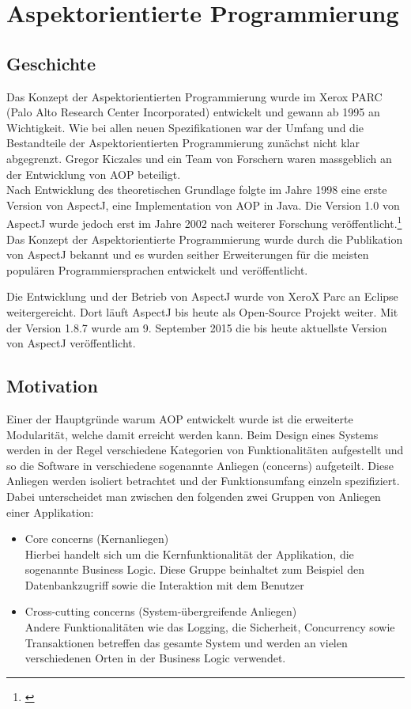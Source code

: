 \chapter{Aspektorientierte Programmierung}
\label{chap:aop}

\section{Geschichte}
\label{sec:aop_geschichte}

Das Konzept der Aspektorientierten Programmierung wurde im Xerox PARC (Palo Alto Research Center Incorporated) entwickelt und gewann ab 1995 an Wichtigkeit. Wie bei allen neuen Spezifikationen war der Umfang und die Bestandteile der Aspektorientierten Programmierung zunächst nicht klar abgegrenzt. Gregor Kiczales und ein Team von Forschern waren massgeblich an der Entwicklung von AOP beteiligt.\\
Nach Entwicklung des theoretischen Grundlage folgte im Jahre 1998 eine erste Version von AspectJ, eine Implementation von AOP in Java. Die Version 1.0 von AspectJ wurde jedoch erst im Jahre 2002 nach weiterer Forschung veröffentlicht.\footnote{\cite{lopes:historyaop}} \\
Das Konzept der Aspektorientierte Programmierung wurde durch die Publikation von AspectJ bekannt und es wurden seither Erweiterungen für die meisten populären Programmiersprachen entwickelt und veröffentlicht. 

Die Entwicklung und der Betrieb von AspectJ wurde von XeroX Parc an Eclipse weitergereicht. Dort läuft AspectJ bis heute als Open-Source Projekt weiter. Mit der Version 1.8.7 wurde am 9. September 2015 die bis heute aktuellste Version von AspectJ veröffentlicht.

\section{Motivation}
\label{sec:aop_motivation}

Einer der Hauptgründe warum AOP entwickelt wurde ist die erweiterte Modularität, welche damit erreicht werden kann. Beim Design eines Systems werden in der Regel verschiedene Kategorien von Funktionalitäten aufgestellt und so die Software in verschiedene sogenannte Anliegen (concerns) aufgeteilt. Diese Anliegen werden isoliert betrachtet und der Funktionsumfang einzeln spezifiziert. Dabei unterscheidet man zwischen den folgenden zwei Gruppen von Anliegen einer Applikation:

\begin{itemize}
	\item Core concerns (Kernanliegen)\\
	Hierbei handelt sich um die Kernfunktionalität der Applikation, die sogenannte Business Logic. Diese Gruppe beinhaltet zum Beispiel den Datenbankzugriff sowie die Interaktion mit dem Benutzer
	\item Cross-cutting concerns (System-übergreifende Anliegen) \\
	Andere Funktionalitäten wie das Logging, die Sicherheit, Concurrency sowie Transaktionen betreffen das gesamte System und werden an vielen verschiedenen Orten in der Business Logic verwendet.
\end{itemize}

